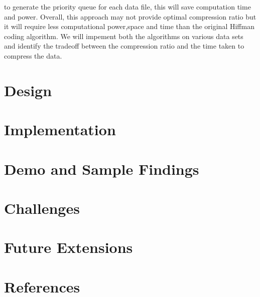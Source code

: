 \documentclass[10pt,conference]{IEEEtran}
\begin{document}
{to generate the priority queue for each data file, this will save computation time and power. Overall, this approach may not provide optimal compression ratio but it will require less computational power,space and time than the original  Hiffman coding algorithm. We will impement both the algorithms on various data sets and identify the tradeoff between the compression ratio and the time taken to compress the data.  
}

\section{Design }\label{sec:2 Design.}

\section{Implementation}\label{sec:3 Implementation }

\section{Demo and Sample Findings}\label{sec:4 Demo and Sample Findings }

\section{Challenges}\label{sec:5 Challenges. }

\section{Future Extensions}\label{sec:6 Future Extensions. }

\section{References}\label{sec:7 References. }

\end{document}
